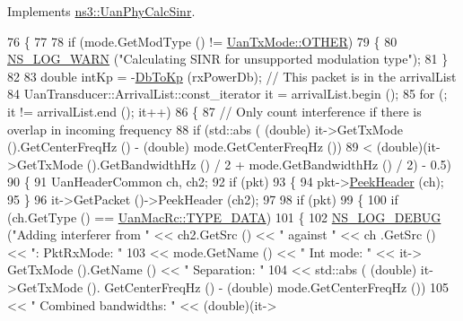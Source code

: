 Implements \hyperlink{classns3_1_1UanPhyCalcSinr_ad595f00cc07f863e9f5f957e2f772d56}{ns3\+::\+Uan\+Phy\+Calc\+Sinr}.


\begin{DoxyCode}
76 \{
77 
78   \textcolor{keywordflow}{if} (mode.GetModType () != \hyperlink{classns3_1_1UanTxMode_a0e822d222c13aa9499c96d9b3ad21223a5358ed9e093870402823f95c2cda1110}{UanTxMode::OTHER})
79     \{
80       \hyperlink{group__logging_gade7208b4009cdf0e25783cd26766f559}{NS\_LOG\_WARN} (\textcolor{stringliteral}{"Calculating SINR for unsupported modulation type"});
81     \}
82 
83   \textcolor{keywordtype}{double} intKp = -\hyperlink{classns3_1_1UanPhyCalcSinr_a7af4e8735a93dabeef93d929fe166d27}{DbToKp} (rxPowerDb); \textcolor{comment}{// This packet is in the arrivalList}
84   UanTransducer::ArrivalList::const\_iterator it = arrivalList.begin ();
85   \textcolor{keywordflow}{for} (; it != arrivalList.end (); it++)
86     \{
87       \textcolor{comment}{// Only count interference if there is overlap in incoming frequency}
88       \textcolor{keywordflow}{if} (std::abs ( (\textcolor{keywordtype}{double}) it->GetTxMode ().GetCenterFreqHz () - (double) mode.GetCenterFreqHz ())
89           < (\textcolor{keywordtype}{double})(it->GetTxMode ().GetBandwidthHz () / 2 + mode.GetBandwidthHz () / 2) - 0.5)
90         \{
91           UanHeaderCommon ch, ch2;
92           \textcolor{keywordflow}{if} (pkt)
93             \{
94               pkt->\hyperlink{classns3_1_1Packet_aadc63487bea70945c418f4c3e9b81964}{PeekHeader} (ch);
95             \}
96           it->GetPacket ()->PeekHeader (ch2);
97 
98           \textcolor{keywordflow}{if} (pkt)
99             \{
100               \textcolor{keywordflow}{if} (ch.GetType () == \hyperlink{classns3_1_1UanMacRc_ad12bbd636f03943095e1c81cd1cc24b3a21bca93e0670db9a343de5d95ff64092}{UanMacRc::TYPE\_DATA})
101                 \{
102                   \hyperlink{group__logging_ga413f1886406d49f59a6a0a89b77b4d0a}{NS\_LOG\_DEBUG} (\textcolor{stringliteral}{"Adding interferer from "} << ch2.GetSrc () << \textcolor{stringliteral}{" against "} << ch
      .GetSrc () << \textcolor{stringliteral}{": PktRxMode: "}
103                                                           << mode.GetName () << \textcolor{stringliteral}{" Int mode: "} << it->
      GetTxMode ().GetName () << \textcolor{stringliteral}{" Separation: "}
104                                                           << std::abs ( (\textcolor{keywordtype}{double}) it->GetTxMode ().
      GetCenterFreqHz () - (double) mode.GetCenterFreqHz ())
105                                                           << \textcolor{stringliteral}{" Combined bandwidths: "} << (\textcolor{keywordtype}{double})(it->

\end{DoxyCode}
